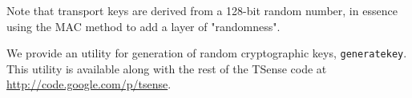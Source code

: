 Note that transport keys are derived from a 128-bit random number, in essence using the MAC method to add a layer of "randomness".

We provide an utility for generation of random cryptographic keys, \texttt{generatekey}. This utility is available along with the rest of the TSense code at \url{http://code.google.com/p/tsense}.

%
%
%
